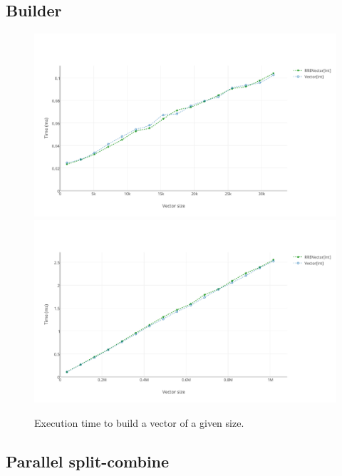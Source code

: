\subsection{Builder}

\begin{figure}[h!]
  \centering
  \includegraphics[width=\textwidth]{Benchmarks/Builder_3.pdf}
  \includegraphics[width=\textwidth]{Benchmarks/Builder_4.pdf}
  \label{BuilderBenchmarks}
  \caption{Execution time to build a vector of a given size.}
\end{figure}

\subsection{Parallel split-combine}

